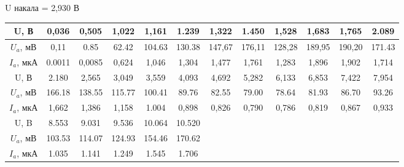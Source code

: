\documentclass[12pt,a4paper]{article}
\begin{document}
\begin{center}
U накала = 2,930 В
\begin{tabular}{|c|c|c|c|c|c|c|c|c|c|c|c|}
\hline 
U, В & 0,036 & 0,505 & 1,022 & 1,161 & 1.239 & 1,322 & 1.450 & 1,528 & 1,683 & 1,765 & 2.089 \\
\hline 
$U_a$, мВ & 0,11 & 0.85 & 62.42 & 104.63 & 130.38 & 147,67 & 176,11 & 128,28 & 189,95 & 190,20 & 171.43  \\ 
\hline 
$I_a$, мкА & 0.0011 & 0,0085 & 0,624 & 1,046 & 1,304 & 1,477 & 1,761 & 1,283 & 1,896 & 1,902 & 1,714 \\ 
\hline 
U, В& 2.180 & 2,565 & 3,049 & 3,559 & 4,093 & 4,692 & 5,282 & 6,133 & 6,853 & 7,422 & 7,954  \\ 
\hline
$U_a$, мВ & 166.18 & 138.55 & 115.77 & 100.41 & 89.76 & 82.55 & 79.00 & 78.64 & 81.93 & 86.70 & 93.26  \\
\hline
$I_a$, мкА & 1,662 & 1,386 & 1,158 & 1.004 & 0,898 & 0,826 & 0,790 & 0,786 & 0,819 & 0,867 & 0,933  \\
\hline
U, B & 8.553 & 9.031 & 9.536 & 10.064 & 10.520 & & & & & &\\
\hline
$U_a$, мВ & 103.53 & 114.07 & 124.93 & 154.46 & 170.62 & & & & & & \\
\hline
$I_a$, мкА & 1.035 & 1.141 & 1.249 & 1.545 & 1.706 & & & & & & \\
\hline
\end{tabular} 
\end{center}
\end{document}
